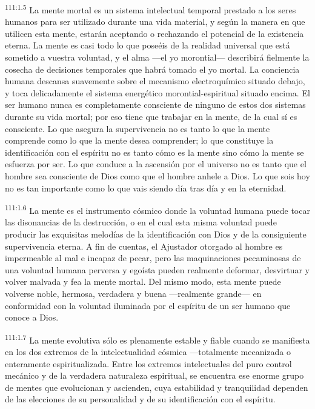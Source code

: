 \documentclass[twoside, 11pt]{book}
\begin{document}
\par
\textsuperscript{111:1.5} La mente mortal es un sistema intelectual temporal prestado a los seres humanos para ser utilizado durante una vida material, y según la manera en que utilicen esta mente, estarán aceptando o rechazando el potencial de la existencia eterna. La mente es casi todo lo que poseéis de la realidad universal que está sometido a vuestra voluntad, y el alma ---el yo morontial--- describirá fielmente la cosecha de decisiones temporales que habrá tomado el yo mortal. La conciencia humana descansa suavemente sobre el mecanismo electroquímico situado debajo, y toca delicadamente el sistema energético morontial-espiritual situado encima. El ser humano nunca es completamente consciente de ninguno de estos dos sistemas durante su vida mortal; por eso tiene que trabajar en la mente, de la cual sí es consciente. Lo que asegura la supervivencia no es tanto lo que la mente comprende como lo que la mente desea comprender; lo que constituye la identificación con el espíritu no es tanto cómo es la mente sino cómo la mente se esfuerza por ser. Lo que conduce a la ascensión por el universo no es tanto que el hombre sea consciente de Dios como que el hombre anhele a Dios. Lo que sois hoy no es tan importante como lo que vais siendo día tras día y en la eternidad.

\par
\textsuperscript{111:1.6} La mente es el instrumento cósmico donde la voluntad humana puede tocar las disonancias de la destrucción, o en el cual esta misma voluntad puede producir las exquisitas melodías de la identificación con Dios y de la consiguiente supervivencia eterna. A fin de cuentas, el Ajustador otorgado al hombre es impermeable al mal e incapaz de pecar, pero las maquinaciones pecaminosas de una voluntad humana perversa y egoísta pueden realmente deformar, desvirtuar y volver malvada y fea la mente mortal. Del mismo modo, esta mente puede volverse noble, hermosa, verdadera y buena ---realmente grande--- en conformidad con la voluntad iluminada por el espíritu de un ser humano que conoce a Dios.

\par
\textsuperscript{111:1.7} La mente evolutiva sólo es plenamente estable y fiable cuando se manifiesta en los dos extremos de la intelectualidad cósmica ---totalmente mecanizada o enteramente espiritualizada. Entre los extremos intelectuales del puro control mecánico y de la verdadera naturaleza espiritual, se encuentra ese enorme grupo de mentes que evolucionan y ascienden, cuya estabilidad y tranquilidad dependen de las elecciones de su personalidad y de su identificación con el espíritu.
\end{document}
